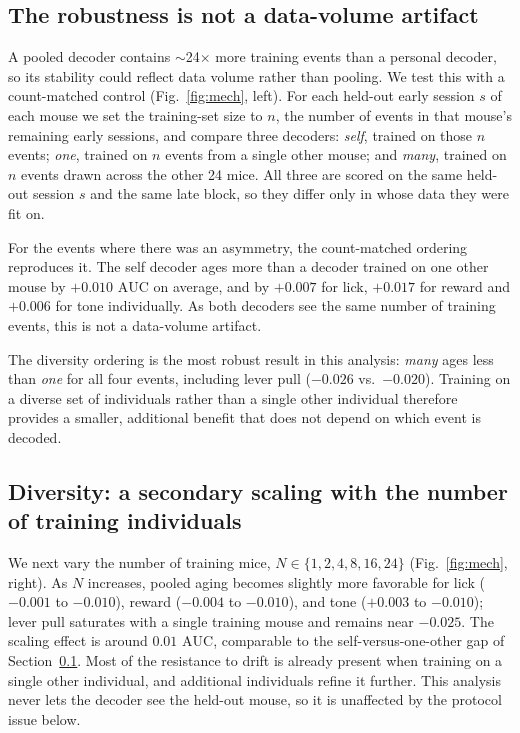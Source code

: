 \documentclass{article}
\newcommand{\auc}{\mathrm{AUC}}
\begin{document}
\subsection{The robustness is not a data-volume artifact}
\label{sec:matched}
A pooled decoder contains $\sim$24$\times$ more training events than a personal decoder, so its
stability could reflect data volume rather than pooling. We test this with a count-matched control
(Fig.~\ref{fig:mech}, left). For each held-out early session $s$ of each mouse we set the
training-set size to $n$, the number of events in that mouse's remaining early sessions, and compare
three decoders: \emph{self}, trained on those $n$ events; \emph{one}, trained on $n$ events from a
single other mouse; and \emph{many}, trained on $n$ events drawn across the other 24 mice. All three
are scored on the same held-out session $s$ and the same late block, so they differ only in whose
data they were fit on.

For the events where there was an asymmetry, the count-matched ordering reproduces it. The self
decoder ages more than a decoder trained on one other mouse by $+0.010$ $\auc$ on average, and by
$+0.007$ for lick, $+0.017$ for reward and $+0.006$ for tone individually. As both decoders see the
same number of training events, this is not a data-volume artifact.

The diversity ordering is the most robust result in this analysis: \emph{many} ages less than
\emph{one} for all four events, including lever pull ($-0.026$ vs.\ $-0.020$). Training on a diverse
set of individuals rather than a single other individual therefore provides a smaller, additional
benefit that does not depend on which event is decoded.

\subsection{Diversity: a secondary scaling with the number of training individuals}
\label{sec:scaling}
We next vary the number of training mice, $N \in \{1, 2, 4, 8, 16, 24\}$ (Fig.~\ref{fig:mech},
right). As $N$ increases, pooled aging becomes slightly more favorable for lick ($-0.001$ to
$-0.010$), reward ($-0.004$ to $-0.010$), and tone ($+0.003$ to $-0.010$); lever pull saturates with
a single training mouse and remains near $-0.025$. The scaling effect is around $0.01$ $\auc$,
comparable to the self-versus-one-other gap of Section~\ref{sec:matched}. Most of the resistance to
drift is already present when training on a single other individual, and additional individuals
refine it further. This analysis never lets the decoder see the held-out mouse, so it is unaffected
by the protocol issue below.
\end{document}
